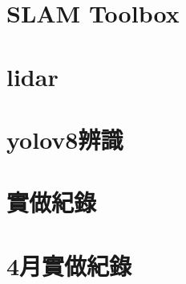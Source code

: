 \documentclass{article}
\begin{document}
\section{SLAM Toolbox}

\section{lidar}

\section{yolov8辨識}


\section{實做紀錄}

\section{4月實做紀錄}

\end{document}
